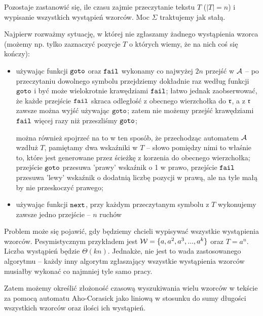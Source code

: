 Pozostaje zastanowić się, ile czasu zajmie przeczytanie tekstu $T$ ($|T|=n$) i wypisanie wszystkich wystąpień wzorców. Moc $\Sigma$ traktujemy jak stałą.

Najpierw rozważmy sytuację, w której nie zgłaszamy żadnego wystąpienia wzorca (możemy np. tylko zaznaczyć pozycje $T$ o których wiemy, że na nich coś się kończy):
\begin{itemize}
    \item używając funkcji $\operatorname{\texttt{goto}}$ oraz $\operatorname{\texttt{fail}}$ wykonamy co najwyżej $2n$ przejść w $\operatorname{\mathcal{A}}$ -- po przeczytaniu dowolnego symbolu przejdziemy dokładnie raz według funkcji $\operatorname{\texttt{goto}}$ i być może wielokrotnie krawędziami $\operatorname{\texttt{fail}}$; łatwo jednak zaobserwować, że każde przejście $\operatorname{\texttt{fail}}$ skraca odległość z obecnego wierzchołka do $\operatorname{\mathfrak{r}}$, a z $\operatorname{\mathfrak{r}}$ zawsze można wyjść używając $\operatorname{\texttt{goto}}$; zatem nie możemy przejść krawędziami $\operatorname{\texttt{fail}}$ więcej razy niż przeszliśmy $\operatorname{\texttt{goto}}$;

    można również spojrzeć na to w ten sposób, że przechodząc automatem $\operatorname{\mathcal{A}}$ wzdłuż $T$, pamiętamy dwa wskaźniki w $T$ -- słowo pomiędzy nimi to właśnie to, które jest generowane przez ścieżkę z korzenia do obecnego wierzchołka; przejście $\operatorname{\texttt{goto}}$ przesuwa 'prawy' wskaźnik o 1 w prawo, przejście $\operatorname{\texttt{fail}}$ przesuwa 'lewy' wskaźnik o dodatnią liczbę pozycji w prawą, ale na tyle małą by nie przeskoczyć prawego;

    \item używając funkcji $\operatorname{\texttt{next}}$, przy każdym przeczytanym symbolu z $T$ wykonujemy zawsze jedno przejście -- $n$ ruchów
\end{itemize}

Problem może się pojawić, gdy będziemy chcieli wypisywać wszystkie wystąpienia wzorców. Pesymistycznym przykładem jest $\operatorname{\mathcal{W}}=\{a,a^2,a^3,...,a^k\}$ oraz $T=a^n$. Liczba wystąpień będzie $\Theta(kn)$. Jednakże, nie jest to wada zastosowanego algorytmu -- każdy inny algorytm zgłaszający wszystkie wystąpienia wzorców musiałby wykonać co najmniej tyle samo pracy.

Zatem możemy określić złożoność czasową wyszukiwania wielu wzorców w tekście za pomocą automatu Aho-Corasick jako liniową w stosunku do sumy długości wszystkich wzorców oraz ilości ich wystąpień.

